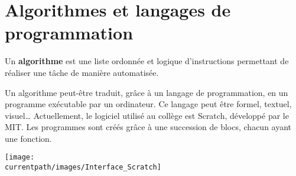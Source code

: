 \section{Algorithmes et langages de programmation}

\begin{definition}[Algorithme]
   Un {\bf algorithme} est une liste ordonnée et logique d'instructions permettant de réaliser une tâche de manière automatisée.
\end{definition}

\medskip
 
Un algorithme peut-être traduit, grâce à un langage de programmation, en un programme exécutable par un ordinateur. Ce langage peut être formel, textuel, visuel\dots{} Actuellement, le logiciel utilisé au collège est Scratch, développé par le MIT. Les programmes sont créés grâce à une succession de blocs, chacun ayant une fonction.
\begin{center}
   \texttt{[image: \\currentpath/images/Interface\_Scratch]}
\end{center}